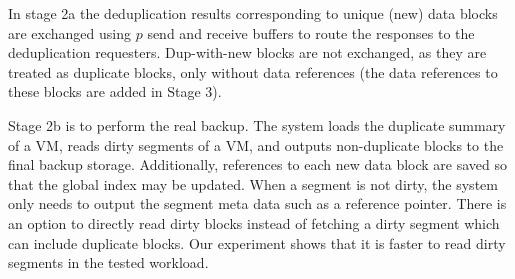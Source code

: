 In stage 2a the deduplication results corresponding to unique (new) data blocks
are exchanged using $p$ send and receive buffers to route the responses to the
deduplication requesters. Dup-with-new blocks are not exchanged, as they are
treated as duplicate blocks, only without data references (the data references
to these blocks are added in Stage 3).


Stage 2b is to perform the real backup.
The system loads the duplicate summary of a VM, 
reads  dirty segments of a VM, and outputs non-duplicate blocks to the final backup 
storage. Additionally, references to each new data block are saved so that the
global index may be updated.%
When a segment is not dirty, the system only needs to output the segment meta data such as a reference pointer. 
There is an option to directly read dirty blocks instead of fetching a dirty segment which can include duplicate
blocks. Our experiment shows that it is faster to read dirty segments in the tested workload.



